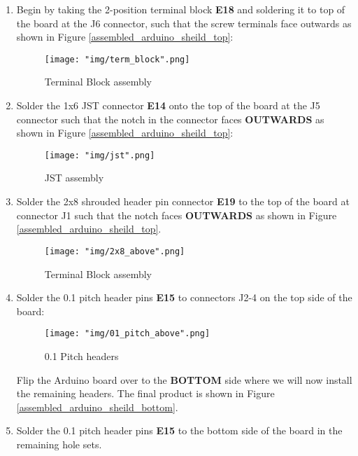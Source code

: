 \documentclass[12pt]{article}
\begin{document}
\begin{enumerate}

	\item Begin by taking the 2-position terminal block \textbf{E18} and soldering it to top of the board at the J6 connector, such that the screw terminals face outwards as shown in Figure \ref{assembled_arduino_sheild_top}:


\begin{figure}[H]
	\centering
	\texttt{[image: "img/term\_block".png]}
	\caption{Terminal Block assembly}
\end{figure}


	\item Solder the 1x6 JST connector \textbf{E14} onto the top of the board at the J5 connector such that the notch in the connector faces \textbf{OUTWARDS} as shown in Figure \ref{assembled_arduino_sheild_top}:

\begin{figure}[H]
	\centering
	\texttt{[image: "img/jst".png]}
	\caption{JST assembly}
\end{figure}

	\item Solder the 2x8 shrouded header pin connector \textbf{E19} to the top of the board at connector J1 such that the notch faces \textbf{OUTWARDS} as shown in Figure \ref{assembled_arduino_sheild_top}.

\begin{figure}[H]
	\centering
	\texttt{[image: "img/2x8\_above".png]}
	\caption{Terminal Block assembly}
\end{figure}

	\item Solder the 0.1 pitch header pins \textbf{E15} to connectors J2-4 on the top side of the board:

\begin{figure}[H]
	\centering
	\texttt{[image: "img/01\_pitch\_above".png]}
	\caption{0.1 Pitch headers}
\end{figure}

Flip the Arduino board over to the \textbf{BOTTOM} side where we will now install the remaining headers. The final product is shown in Figure \ref{assembled_arduino_sheild_bottom}.

	\item Solder the 0.1 pitch header pins \textbf{E15} to the bottom side of the board in the remaining hole sets.


\end{enumerate}
\end{document}
